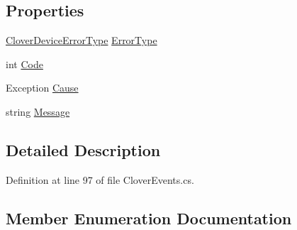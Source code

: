 \subsection*{Properties}
\begin{DoxyCompactItemize}
\item 
\hyperlink{classcom_1_1clover_1_1remotepay_1_1sdk_1_1_clover_device_error_event_a02daf08e6df844b1e25144e6e9f5e422}{Clover\+Device\+Error\+Type} \hyperlink{classcom_1_1clover_1_1remotepay_1_1sdk_1_1_clover_device_error_event_ade077516a0c3a3f2dd000f7bec01f3fb}{Error\+Type}
\item 
int \hyperlink{classcom_1_1clover_1_1remotepay_1_1sdk_1_1_clover_device_error_event_a8e63171bf0f7241f8f1165295b9f0dc9}{Code}
\item 
Exception \hyperlink{classcom_1_1clover_1_1remotepay_1_1sdk_1_1_clover_device_error_event_a450e1bd156646f77549698d022c064e7}{Cause}
\item 
string \hyperlink{classcom_1_1clover_1_1remotepay_1_1sdk_1_1_clover_device_error_event_ae116a3f38e23253e8fc1d49299c1cae6}{Message}
\end{DoxyCompactItemize}


\subsection{Detailed Description}


Definition at line 97 of file Clover\+Events.\+cs.



\subsection{Member Enumeration Documentation}
\mbox{\label{classcom_1_1clover_1_1remotepay_1_1sdk_1_1_clover_device_error_event_a02daf08e6df844b1e25144e6e9f5e422}} 
